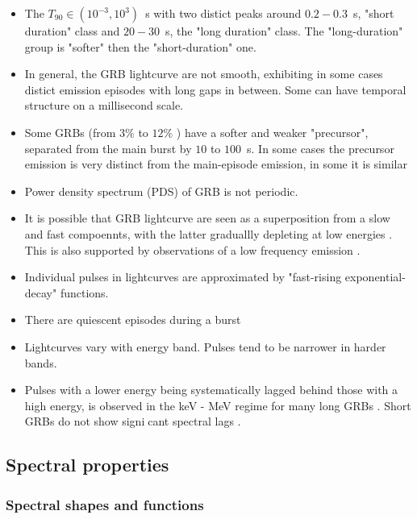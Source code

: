 \begin{itemize}
    \item The $T_{90}\in(10^{-3},10^{3})$~s with two distict peaks around $0.2-0.3$~s, "short duration" class and $20-30$~s, the "long duration" class.
    The "long-duration" group is "softer" then the "short-duration" one.
    \item In general, the GRB lightcurve are not smooth, exhibiting in some cases distict emission episodes with long gaps in between. Some can have temporal structure on a millisecond scale. \cite{Fishman and Meegan, 1995}
    \item Some GRBs (from $3\%$ \cite{Koshut et al., 1995} to $12\%$ \cite{Burlon et al., 2009}) have a softer and weaker "precursor", separated from the main burst by $10$ to $100$~s. In some cases the precursor emission is very distinct from the main-episode emission, in some it is similar \cite{Lazzati, 2005; Burlon et al., 2008, 2009; Hu et al., 2014).}
    \item Power density spectrum (PDS) of GRB is not periodic. 
    \item It is possible that GRB lightcurve are seen as a superposition from a slow and fast compoennts, with the latter graduallly depleting at low energies \cite{Vetere et al., 2006}. This is also supported by observations of a low frequency emission \cite{Gao et al., 2012}.
    \item Individual pulses in lightcurves are approximated by "fast-rising exponential-decay" functions.
    \item There are quiescent episodes during a burst
    \item Lightcurves vary with energy band. Pulses tend to be narrower in harder bands.
    \item Pulses with a lower energy being systematically lagged behind those with a high energy, is observed in the keV - MeV regime for many long GRBs \cite{Norris et al., 2000; Norris, 2002; Norris et al., 2005}. Short GRBs do not show signicant spectral lags \cite{(Norris and Bonnell, 2006)}.
\end{itemize}


\subsection{Spectral properties}

\subsubsection{Spectral shapes and functions}

